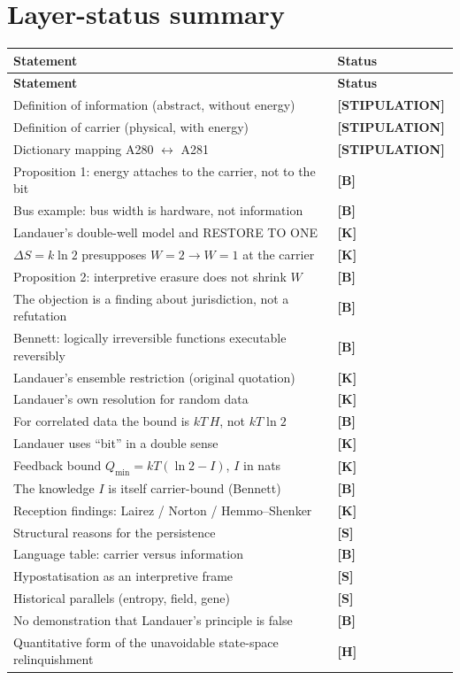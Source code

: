 \documentclass[11pt,a4paper]{article}
\newcommand{\LS}{\textcolor{laySet}{\textbf{\footnotesize\textsf{[STIPULATION]}}}\,}
\newcommand{\LK}{\textcolor{layK}{\textbf{\footnotesize\textsf{[K]}}}\,}
\newcommand{\LB}{\textcolor{layB}{\textbf{\footnotesize\textsf{[B]}}}\,}
\newcommand{\LSk}{\textcolor{layS}{\textbf{\footnotesize\textsf{[S]}}}\,}
\newcommand{\LH}{\textcolor{layH}{\textbf{\footnotesize\textsf{[H]}}}\,}
\theoremstyle{ffgft}
\begin{document}
\section{Layer-status summary}

\begin{center}
\small
\begin{longtable}{@{}p{}l@{}}
\toprule
\textbf{Statement} & \textbf{Status} \\
\midrule
\endfirsthead
\toprule
\textbf{Statement} & \textbf{Status} \\
\midrule
\endhead
Definition of information (abstract, without energy) & \LS \\
Definition of carrier (physical, with energy) & \LS \\
Dictionary mapping A280 $\leftrightarrow$ A281 & \LS \\
Proposition 1: energy attaches to the carrier, not to the bit & \LB \\
Bus example: bus width is hardware, not information & \LB \\
Landauer's double-well model and \textup{RESTORE TO ONE} & \LK \\
$\Delta S = k\ln 2$ presupposes $W{=}2 \to W{=}1$ at the carrier & \LK \\
Proposition 2: interpretive erasure does not shrink $W$ & \LB \\
The objection is a finding about jurisdiction, not a refutation & \LB \\
Bennett: logically irreversible functions executable reversibly & \LB \\
Landauer's ensemble restriction (original quotation) & \LK \\
Landauer's own resolution for random data & \LK \\
For correlated data the bound is $kT\,H$, not $kT\ln 2$ & \LB \\
Landauer uses “bit” in a double sense & \LK \\
Feedback bound $Q_{\min} = kT(\ln 2 - I)$, $I$ in nats & \LK \\
The knowledge $I$ is itself carrier-bound (Bennett) & \LB \\
Reception findings: Lairez / Norton / Hemmo--Shenker & \LK \\
Structural reasons for the persistence & \LSk \\
Language table: carrier versus information & \LB \\
Hypostatisation as an interpretive frame & \LSk \\
Historical parallels (entropy, field, gene) & \LSk \\
No demonstration that Landauer's principle is false & \LB \\
Quantitative form of the unavoidable state-space relinquishment & \LH \\
\bottomrule
\end{longtable}
\end{center}
\end{document}
